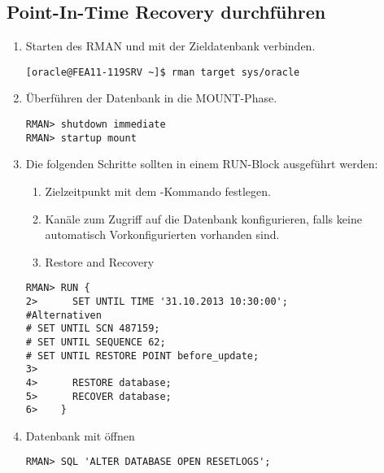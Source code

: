       \subsection{Point-In-Time Recovery durchführen}\label{dbpitrinc}
        \begin{enumerate}
          \item Starten des RMAN und mit der Zieldatenbank verbinden.
            \begin{lstlisting}[caption={Starten und Anmelden},label=admin1498,language=rman]
[oracle@FEA11-119SRV ~]$ rman target sys/oracle
            \end{lstlisting}
          \item Überführen der Datenbank in die MOUNT-Phase.
            \begin{lstlisting}[caption={Shutdown und Mounten},label=admin1499,language=rman,alsolanguage=sqlplus]
RMAN> shutdown immediate
RMAN> startup mount
            \end{lstlisting}
          \item Die folgenden Schritte sollten in einem RUN-Block ausgeführt werden:
            \begin{enumerate}
              \item Zielzeitpunkt mit dem -Kommando festlegen.
              \item Kanäle zum Zugriff auf die Datenbank konfigurieren, falls keine automatisch Vorkonfigurierten vorhanden sind.
              \item Restore and Recovery
            \end{enumerate}
            \begin{lstlisting}[caption={Restore and Recovery},label=admin1500,language=rman]
RMAN> RUN {
2>      SET UNTIL TIME '31.10.2013 10:30:00';
#Alternativen
# SET UNTIL SCN 487159;
# SET UNTIL SEQUENCE 62;
# SET UNTIL RESTORE POINT before_update;
3>
4>      RESTORE database;
5>      RECOVER database;
6>    }
            \end{lstlisting}
          \item Datenbank mit  öffnen
            \begin{lstlisting}[caption={Datenbank mit open resetlogs öffnen},label=admin1501,language=rman,emph={[9]ALTER,DATABASE,OPEN,RESETLOGS},emphstyle={[9]\color{magenta}\bfseries}]
RMAN> SQL 'ALTER DATABASE OPEN RESETLOGS';
            \end{lstlisting}
        \end{enumerate}
